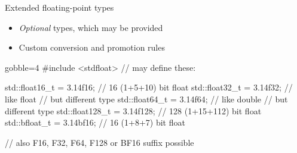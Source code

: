 \begin{advanced}
\begin{frame}[fragile]
    \begin{block}{Extended floating-point types}
        \begin{itemize}
            \item \emph{Optional} types, which may be provided
            \item Custom conversion and promotion rules
        \end{itemize}
    \end{block}
    \begin{cppcode*}{gobble=4}
        #include <stdfloat> // may define these:

        std::float16_t  = 3.14f16;  // 16 (1+5+10) bit float
        std::float32_t  = 3.14f32;  // like float
                                    // but different type
        std::float64_t  = 3.14f64;  // like double
                                    // but different type
        std::float128_t = 3.14f128; // 128 (1+15+112) bit float
        std::bfloat_t   = 3.14bf16; // 16 (1+8+7) bit float

        // also F16, F32, F64, F128 or BF16 suffix possible
    \end{cppcode*}
\end{frame}
\end{advanced}
